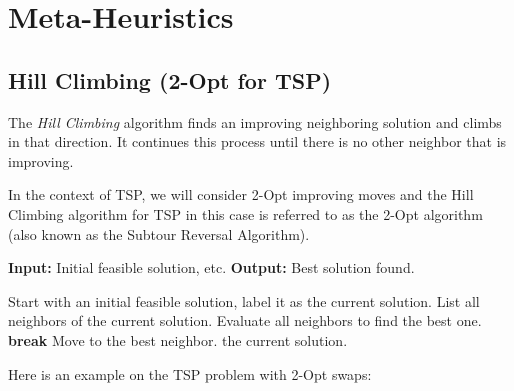 \section{Meta-Heuristics}

\subsection{Hill Climbing (2-Opt for TSP)}
The \emph{Hill Climbing} algorithm finds an improving neighboring solution and climbs in that direction.  It continues this process until there is no other neighbor that is improving.  

In the context of TSP, we will consider 2-Opt improving moves and the Hill Climbing algorithm for TSP in this case is referred to as the 2-Opt algorithm (also known as the Subtour Reversal Algorithm).
\begin{algorithm}
\caption{Hill Climbing}
\begin{algorithmic}[1]
    \State \textbf{Input:} Initial feasible solution, etc.
    \State \textbf{Output:} Best solution found.
    
    \State Start with an initial feasible solution, label it as the current solution.
    \Repeat
        \State List all neighbors of the current solution.
        \State Evaluate all neighbors to find the best one.
            \State \textbf{break}
        \EndIf
        \State Move to the best neighbor.
    \State \Return the current solution.
\end{algorithmic}
\end{algorithm}

Here is an example on the TSP problem with 2-Opt swaps:

